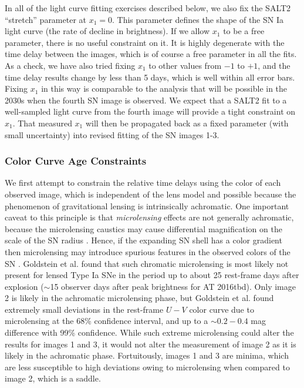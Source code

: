 \documentclass[12pt]{article}
\def\SNABC{AT 2016tbd\xspace}
\begin{document}
In all of the light curve fitting exercises described below, we also fix the SALT2 ``stretch'' parameter at $x_1=0$. This parameter defines the shape of the SN Ia light curve (the rate of decline in brightness). If we  allow $x_1$ to be a free parameter, there is no useful constraint on it.  It is highly degenerate with the time delay between the images, which is of course a free parameter in all the fits.  
As a check, we have also tried fixing $x_1$ to other values from $-1$ to $+1$, and the time delay results change by less than 5 days, which is well within all error bars.   
Fixing $x_1$ in this way is comparable to the analysis that will be possible in the 2030s when the fourth SN image is observed. We expect that a SALT2 fit to a well-sampled light curve from the fourth image will provide a tight constraint on $x_1$.  That measured $x_1$ will then be propagated back as a fixed parameter (with small uncertainty) into revised fitting of the SN images 1-3. 

\subsubsection*{Color Curve Age Constraints}

We first attempt to constrain the relative time delays using the color of each observed image, which is independent of the lens model and possible because the phenomenon of gravitational lensing is intrinsically achromatic. One important caveat to this principle is that {\it microlensing} effects are not generally achromatic, because the microlensing caustics may cause differential magnification on the scale of the SN radius \cite{goldstein_precise_2018,foxley-marrable_impact_2018,bonvin_impact_2019}.  Hence, if the expanding SN shell has a color gradient then microlensing may introduce spurious features in the observed colors of the SN \cite{kochanek_quantitative_2004,vernardos_joint_2018}.   Goldstein et al. \cite{goldstein_precise_2018} found that such chromatic microlensing is most likely not present for lensed Type Ia SNe in the period up to about 25 rest-frame days after explosion ($\sim$15 observer days after peak brightness for \SNABC). Only image 2 is likely in the achromatic microlensing phase, but Goldstein et al. \cite{goldstein_precise_2018} found extremely small deviations in the rest-frame $U-V$ color curve due to microlensing at the 68\% confidence interval, and up to a $\sim0.2-0.4$ mag difference with 99\% confidence. While such extreme microlensing could alter the results for images 1 and 3, it would not alter the measurement of image 2 as it is likely in the achromatic phase.
Fortuitously, images 1 and 3 are minima, which are less susceptible to high deviations owing to microlensing when compared to image 2, which is a saddle.
\end{document}
